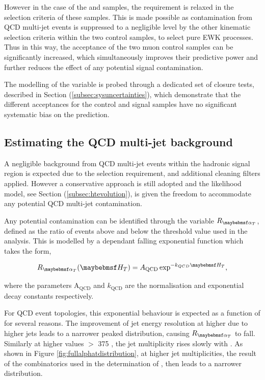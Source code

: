 However in the case of the \mupjets and \dimupjets samples, the \alphat requirement is relaxed in the selection criteria of these samples. This is made possible as contamination from QCD multi-jet events is suppressed to a negligible level by the other kinematic selection criteria within the two control samples, to select pure \ac{EWK} processes. Thus in this way, the acceptance of the two muon control samples can be significantly increased, which simultaneously improves their predictive power and further reduces the effect of any potential signal contamination. 

The modelling of the \alphat variable is probed through a dedicated set of closure tests, described in Section (\ref{subsec:sysuncertainties}), which demonstrate that the different \alphat acceptances for the control and signal samples have no significant systematic bias on the prediction.


\subsection{Estimating the QCD multi-jet background}
\label{subsec:qcdbackground}

A negligible background from QCD multi-jet events within the hadronic signal region is expected due to the selection requirement, and additional cleaning filters applied. However a conservative approach is still adopted and the likelihood model, see Section (\ref{subsec:htevolution}), is given the freedom to accommodate any potential QCD multi-jet contamination. 

Any potential contamination can be identified through the variable $R_{\alphat}$, defined as the ratio of events above and below the \alphat threshold value used in the analysis. This is modelled by a \theht dependant falling exponential function which takes the form,

\begin{equation}
\label{eq:qcdmodel}
R_{\alphat}(\theht) =  A_{\text{QCD}} \exp^{-k_{QCD}\theht},
\end{equation}

where the parameters A$_{\text{QCD}}$ and $k_{\text{QCD}}$ are the normalisation and exponential decay constants respectively. 

For QCD event topologies, this exponential behaviour is expected as a function of \theht for several reasons. The improvement of jet energy resolution at higher \theht due to higher \pt jets leads to a narrower peaked distribution, causing $R_{\alphat}$ to fall. Similarly at higher \theht values $>$ 375 \GeV, the jet multiplicity rises slowly with \theht. As shown in Figure \ref{fig:fullalphatdistribution}, at higher jet multiplicities, the result of the combinatorics used in the determination of \alphat, then leads to a narrower distribution. 

